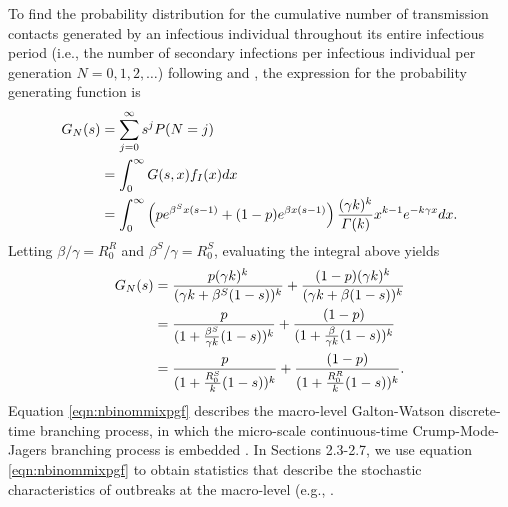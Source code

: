 \documentclass{imammb}
\numberwithin{equation}{section}
\begin{document}
To find the probability distribution for the cumulative number of transmission contacts generated by an infectious individual throughout its entire infectious period (i.e., the number of secondary infections per infectious individual per generation $N = 0, 1,2, \dots$) following \citet{Mode2000-hp} and \citet{Yan2008-jc}, the expression for the probability generating function is
\begin{align}\label{eqn:mixturepgf}
    G_N(s) &= \sum_{j=0}^{\infty} s^j P(N=j) \notag \\ &= \int_0^{\infty} G(s,x) f_I(x) dx \notag \\ &= \int_0^\infty \left (p e^{\beta^S x (s-1)}+(1-p)e^{\beta x (s-1)} \right) \frac{(\gamma k)^k}{\Gamma(k)} x^{k-1}e^{-k \gamma x} dx.
\end{align}
Letting $\beta /\gamma = R_0^R$ and $\beta^S /\gamma = R_0^S$, evaluating the integral above yields %
\begin{align}\label{eqn:nbinommixpgf}
    G_N(s) &=  \frac{p(\gamma k)^k}{(\gamma k + \beta^S(1-s))^k} +   \frac{(1-p)(\gamma k)^k}{(\gamma k + \beta(1-s))^k}\notag  \notag \\ &=  \frac{p}{(1 + \frac{\beta^S}{\gamma k}(1-s))^k} +   \frac{(1-p)}{(1 + \frac{\beta}{\gamma k}(1-s))^k} \notag \\&=  \frac{p}{(1 + \frac{R_0^S}{k}(1-s))^k} +   \frac{(1-p)}{(1 + \frac{R_0^R}{k}(1-s))^k}. 
\end{align}
Equation \eqref{eqn:nbinommixpgf} describes the macro-level Galton-Watson discrete-time branching process, in which the micro-scale continuous-time Crump-Mode-Jagers branching process is embedded  \citep{Mode2000-hp,Garske2008-ax, Yan2008-jc}. In Sections 2.3-2.7, we use equation \eqref{eqn:nbinommixpgf} to obtain statistics that describe the stochastic characteristics of outbreaks at the macro-level (e.g., \citep{Mode2000-hp,Garske2008-ax, Yan2008-jc}.
\end{document}
